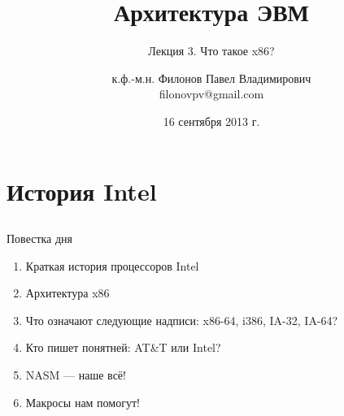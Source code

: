 \documentclass{beamer}
\title{Архитектура ЭВМ}
\subtitle{Лекция 3. Что такое x86?}
\author{к.ф.-м.н. Филонов Павел Владимирович \\ filonovpv@gmail.com}
\date{16 сентября 2013 г.}
\institute[МГТУ ГА] 
{
    Московский Государственный Технический Университет \\
    Гражданской Авиации
}
\begin{document}
    \frame{\titlepage}
    \section{История Intel}
    \subsection{}
    \begin{frame}{Повестка дня}
    	\begin{enumerate}
    	\pause
    	\item Краткая история процессоров Intel
    	\pause
    	\item Архитектура x86
    	\pause
    	\item Что означают следующие надписи: x86-64, i386, IA-32, IA-64?
    	\pause
    	\item Кто пишет понятней: AT\&T или Intel?
    	\pause
    	\item NASM --- наше всё!
    	\pause
    	\item Макросы нам помогут!
    	\end{enumerate}
    \end{frame}
\end{document}
